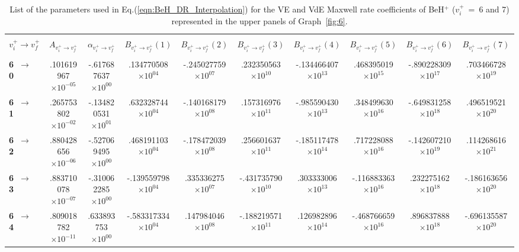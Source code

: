 \documentclass[reviewcopy]{elsarticle}
\begin{document}
\begin{landscape}
\renewcommand{\thefootnote}{\fnsymbol{footnote}}
\renewcommand{\arraystretch}{0.81}
\scriptsize
\setlength\tabcolsep{1.2ex}
\begin{longtable}{lccccccccc}
\caption[table5]{List of the parameters used in Eq.(\ref{eqn:BeH_DR_Interpolation}) for the VE and VdE Maxwell rate coefficients of BeH$^+$  ($v^+_i$~=~6 and 7) represented in the upper panels of Graph~\ref{fig:6}.}\label{tab:BeH_VE_Interpolation6-7}\vspace{0.5cm}\\
\hline \\[-2ex]
   \multicolumn{1}{c}{$v^+_i \to v^+_f$} &
   \multicolumn{1}{c}{$A_{{v^+_i}\to {v^+_f}}$} &
   \multicolumn{1}{c}{$\alpha_{{v^+_i}\to {v^+_f}}$} &
   \multicolumn{1}{c}{$B_{{v^+_i}\to {v^+_f}}(1)$} &
   \multicolumn{1}{c}{$B_{{v^+_i}\to {v^+_f}}(2)$} &
   \multicolumn{1}{c}{$B_{{v^+_i}\to {v^+_f}}(3)$} &
   \multicolumn{1}{c}{$B_{{v^+_i}\to {v^+_f}}(4)$}  &
   \multicolumn{1}{c}{$B_{{v^+_i}\to {v^+_f}}(5)$} &
   \multicolumn{1}{c}{$B_{{v^+_i}\to {v^+_f}}(6)$} &
   \multicolumn{1}{c}{$B_{{v^+_i}\to {v^+_f}}(7)$} \\[5pt]
 \hline \\[-2ex]
\endhead
{\bf 6~$\to$~ 0}  &  .101619967$\times10^{-05}$ & -.617687637$\times10^{00}$ &  .134770508$\times10^{04}$ & -.245027759$\times10^{07}$ &  .232350563$\times10^{10}$ & -.134466407$\times10^{13}$ &  .468395019$\times10^{15}$ & -.890228309$\times10^{17}$ &  .703466728$\times10^{19}$ \\
{\bf 6~$\to$~ 1}  &  .265753802$\times10^{-02}$ & -.134820531$\times10^{01}$ &  .632328744$\times10^{04}$ & -.140168179$\times10^{08}$ &  .157316976$\times10^{11}$ & -.985590430$\times10^{13}$ &  .348499630$\times10^{16}$ & -.649831258$\times10^{18}$ &  .496519521$\times10^{20}$ \\
{\bf 6~$\to$~ 2}  &  .880428656$\times10^{-06}$ & -.527069495$\times10^{00}$ &  .468191103$\times10^{04}$ & -.178472039$\times10^{08}$ &  .256601637$\times10^{11}$ & -.185117478$\times10^{14}$ &  .717228088$\times10^{16}$ & -.142607210$\times10^{19}$ &  .114268616$\times10^{21}$ \\
{\bf 6~$\to$~ 3}  &  .883710078$\times10^{-07}$ & -.310062285$\times10^{00}$ & -.139559798$\times10^{04}$ &  .335336275$\times10^{07}$ & -.431735790$\times10^{10}$ &  .303333006$\times10^{13}$ & -.116883363$\times10^{16}$ &  .232275162$\times10^{18}$ & -.186163656$\times10^{20}$ \\
{\bf 6~$\to$~ 4}  &  .809018782$\times10^{-11}$ &  .633893753$\times10^{00}$ & -.583317334$\times10^{04}$ &  .147984046$\times10^{08}$ & -.188219571$\times10^{11}$ &  .126982896$\times10^{14}$ & -.468766659$\times10^{16}$ &  .896837888$\times10^{18}$ & -.696135587$\times10^{20}$ \\

\end{longtable}
\end{landscape}
\end{document}
